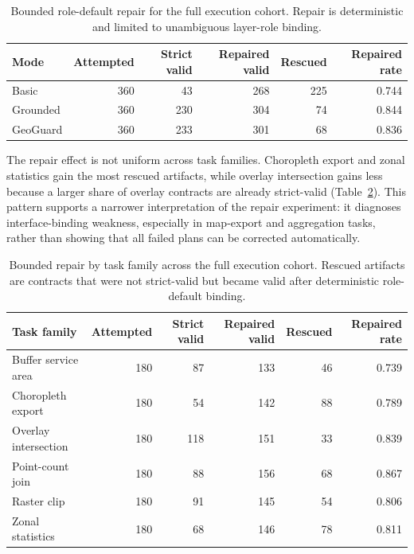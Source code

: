 \documentclass[12pt]{gsis}  %
\begin{document}
\begin{table}[htbp]
\centering
\caption{Bounded role-default repair for the full execution cohort. Repair is deterministic and limited to unambiguous layer-role binding.}
\label{tab:repair-execution}
\small
\setlength{\tabcolsep}{4pt}
\begin{tabular}{lrrrrr}
\toprule
Mode & Attempted & Strict valid & Repaired valid & Rescued & Repaired rate \\
\midrule
Basic & 360 & 43 & 268 & 225 & 0.744 \\
Grounded & 360 & 230 & 304 & 74 & 0.844 \\
GeoGuard & 360 & 233 & 301 & 68 & 0.836 \\
\bottomrule
\end{tabular}
\end{table}

The repair effect is not uniform across task families. Choropleth export and zonal statistics gain the most rescued artifacts, while overlay intersection gains less because a larger share of overlay contracts are already strict-valid (Table~\ref{tab:repair-family}). This pattern supports a narrower interpretation of the repair experiment: it diagnoses interface-binding weakness, especially in map-export and aggregation tasks, rather than showing that all failed plans can be corrected automatically.

\begin{table}[htbp]
\centering
\caption{Bounded repair by task family across the full execution cohort. Rescued artifacts are contracts that were not strict-valid but became valid after deterministic role-default binding.}
\label{tab:repair-family}
\small
\setlength{\tabcolsep}{3pt}
\begin{tabular}{lrrrrr}
\toprule
Task family & Attempted & Strict valid & Repaired valid & Rescued & Repaired rate \\
\midrule
Buffer service area & 180 & 87 & 133 & 46 & 0.739 \\
Choropleth export & 180 & 54 & 142 & 88 & 0.789 \\
Overlay intersection & 180 & 118 & 151 & 33 & 0.839 \\
Point-count join & 180 & 88 & 156 & 68 & 0.867 \\
Raster clip & 180 & 91 & 145 & 54 & 0.806 \\
Zonal statistics & 180 & 68 & 146 & 78 & 0.811 \\
\bottomrule
\end{tabular}
\end{table}
\end{document}
